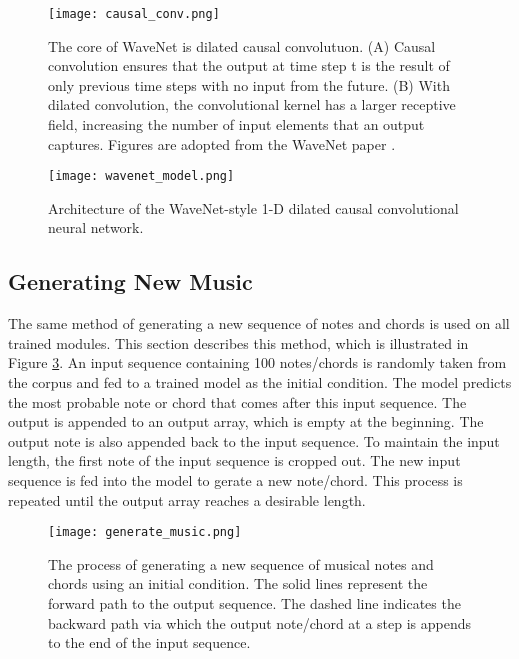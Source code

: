\documentclass[sigconf,authorversion]{acmart}
\begin{document}
\begin{figure}[h]
  \centering
  \texttt{[image: causal\_conv.png]}
  \caption{The core of WaveNet is dilated causal convolutuon. (A) Causal convolution 
  ensures that the output at time step t is the result of only previous time steps 
  with no input from the future. (B) With dilated convolution, the convolutional
  kernel has a larger receptive field, increasing the number of input elements
  that an output captures. Figures are adopted from the WaveNet paper \cite{oord_wavenet_2016}.}
  \label{causal_conv}
\end{figure}

\begin{figure}[h]
  \centering
  \texttt{[image: wavenet\_model.png]}
  \caption{Architecture of the WaveNet-style 1-D dilated causal convolutional neural network.}
  \label{wavenet_model}
\end{figure}

\subsection{Generating New Music}

The same method of generating a new sequence of notes and chords is used on all trained
modules. This section describes this method, which is illustrated in Figure \ref{generate_music}. 
An input sequence containing 100 notes/chords is randomly taken from the corpus and
fed to a trained model as the initial condition. The model predicts the most probable note
or chord that comes after this input sequence. The output is appended to an output array, which is
empty at the beginning. The output note is also appended back to the input sequence. To maintain 
the input length, the first note of the input sequence is cropped out. The new input sequence
is fed into the model to gerate a new note/chord. This process is repeated until the output
array reaches a desirable length.

\begin{figure}[h]
  \centering
  \texttt{[image: generate\_music.png]}
  \caption{The process of generating a new sequence of musical notes and chords 
  using an initial condition. The solid lines represent the forward path to the output
  sequence. The dashed line indicates the backward path via which the output note/chord at
  a step is appends to the end of the input sequence.}
  \label{generate_music}
\end{figure}
\end{document}
